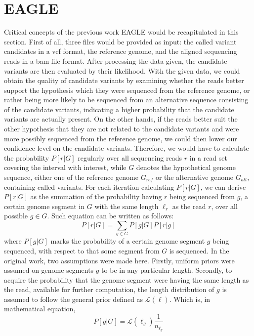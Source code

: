 \documentclass{PHlab-thesis}
\begin{document}
\section{EAGLE}
Critical concepts of the previous work EAGLE would be recapitulated in this section. First of all, three files would be provided as input: the called variant candidates in a vcf format, the reference genome, and the aligned sequencing reads in a bam file format. After processing the data given, the candidate variants are then evaluated by their likelihood. With the given data, we could obtain the quality of candidate variants by examining whether the reads better support the hypothesis which they were sequenced from the reference genome, or rather being more likely to be sequenced from an alternative sequence consisting of the candidate variants, indicating a higher probability that the candidate variants are actually present. On the other hands, if the reads better suit the other hypothesis that they are not related to the candidate variants and were more possibly sequenced from the reference genome, we could then lower our confidence level on the candidate variants. Therefore, we would have to calculate the probability $P[r|G]$ regularly over all sequencing reads $r$ in a read set covering the interval with interest, while $G$ denotes the hypothetical genome sequence, either one of the reference genome $G_{ref}$ or the alternative genome $G_{alt}$, containing called variants. For each iteration calculating $P[r|G]$, we can derive $P[r|G]$ as the summation of the probability having $r$ being sequenced from $g$, a certain genome segment in $G$ with the same length $\ell_r$ as the read $r$, over all possible ${g\in G}$. Such equation can be written as follows:
\begin{equation}
P[r|G] = \sum_{g\in G} P[g|G] P[r|g]
\end{equation}
where $P[g|G]$ marks the probability of a certain genome segment $g$ being sequenced, with respect to that some segment from $G$ is sequenced. In the original work, two assumptions were made here. Firstly, uniform priors were assumed on genome segments $g$ to be in any particular length. Secondly, to acquire the probability that the genome segment were having the same length as the read, available for further computation, the length distribution of $g$ is assumed to follow the general prior defined as $\mathcal{L}(\ell)$. Which is, in mathematical equation,
\begin{equation}
P[g|G] = \mathcal{L}(\ell_g) \frac{1}{n_{\ell_g}}
\end{equation}
\end{document}
